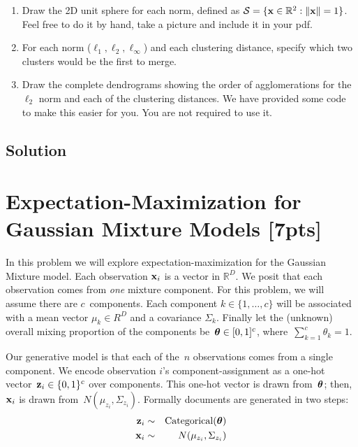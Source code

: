 \documentclass[submit]{harvardml}
\begin{document}
\begin{problem}
  \begin{enumerate}
  \item Draw the 2D unit sphere for each norm,
  defined as $\mathcal{S} = \{\mathbf{x} \in \mathbb{R}^2: \|\mathbf{x}\| = 1 \}$. Feel free to do
  it by hand, take a picture and include it in your pdf.
\item  For each norm ($\ell_1, \ell_2, \ell_\infty$) and each clustering distance, specify which two clusters would
  be the first to merge.
\item Draw the complete dendrograms showing the order of agglomerations for the $\ell_2$ norm and each of the clustering distances. We have provided some code to make this easier for you. You are not required to use it.
  \end{enumerate}


\end{problem}

\subsection*{Solution}
\newpage 

\section*{Expectation-Maximization for Gaussian Mixture Models [7pts]}


In this problem we will explore expectation-maximization for the
Gaussian Mixture model.  Each observation $\mathbf{x}_i$ is a vector in
$\mathbb{R}^{D}$.  We posit that each observation comes from
\emph{one} mixture component.  For this problem, we will assume there
are $c$~components. Each component $k \in \{1, \ldots, c\}$ will be
associated with a mean vector $\mu_k \in R^{D}$ and a covariance
$\Sigma_k$.  Finally let the (unknown) overall mixing proportion of
the components be~$\boldsymbol{\theta} \in [0,1]^c$, where~${\sum_{k=1}^c
  \theta_k=1}$.

Our generative model is that each of the~$n$ observations comes from a
single component.  We encode observation $i$'s component-assignment as
a one-hot vector~${\mathbf{z}_i \in \{0,1\}^c}$ over components. This
one-hot vector is drawn from~$\boldsymbol{\theta}$; then, $\mathbf{x}_i$ is drawn
from~$N(\mu_{z_i}, \Sigma_{z_i})$. Formally documents are generated in two steps:
\begin{eqnarray*}
 \mathbf{z}_i &\sim& \text{Categorical}(\boldsymbol{\theta}) \\
 \mathbf{x}_i &\sim& N(\mu_{z_i}, \Sigma_{z_i})
\end{eqnarray*}
\end{document}
